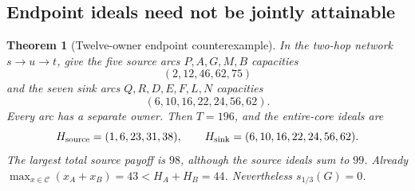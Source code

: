\documentclass[11pt]{article}
\newtheorem{theorem}{Theorem}[section]
\theoremstyle{remark}
\newcommand{\core}{\mathcal C}
\begin{document}
\subsection{Endpoint ideals need not be jointly attainable}
\begin{theorem}[Twelve-owner endpoint counterexample]\label{flow:endpoint}
In the two-hop network $s\to u\to t$, give the five source arcs
$P,A,G,M,B$ capacities
\[
                         (2,12,46,62,75)
\]
and the seven sink arcs $Q,R,D,E,F,L,N$ capacities
\[
                         (6,10,16,22,24,56,62).
\]
Every arc has a separate owner. Then $T=196$, and the entire-core ideals
are
\[
 H_{\rm source}=(1,6,23,31,38),\qquad
 H_{\rm sink}=(6,10,16,22,24,56,62).
\]
The largest total source payoff is $98$, although the source ideals sum
to $99$. Already $\max_{x\in\core}(x_A+x_B)=43< H_A+H_B=44$.
Nevertheless $s_{1/3}(G)=0$.
\end{theorem}
\end{document}
